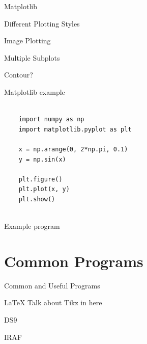 \documentclass{beamer}
\begin{document}
\begin{frame}{Matplotlib}
  \begin{block}{Different Plotting Styles}

  \end{block}
  \begin{block}{Image Plotting}

  \end{block}
  \begin{block}{Multiple Subplots}

  \end{block}
  \begin{block}{Contour?}

  \end{block}  
\end{frame}


\begin{frame}[fragile]{Matplotlib example}
  \begin{lstlisting}

    import numpy as np
    import matplotlib.pyplot as plt
  
    x = np.arange(0, 2*np.pi, 0.1)
    y = np.sin(x)
  
    plt.figure()
    plt.plot(x, y)
    plt.show()
  
  \end{lstlisting}
\end{frame}


\begin{frame}{Example program}

\end{frame}


\section{Common Programs}
\begin{frame}{Common and Useful Programs}
  \begin{block}{LaTeX}
    Talk about Tikz in here
  \end{block}
  \begin{block}{DS9}
  \end{block}
  \begin{block}{IRAF}
  \end{block}
\end{frame}
\end{document}
